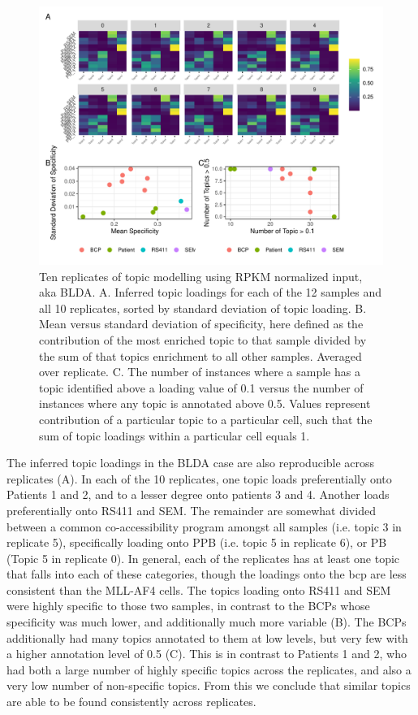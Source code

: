 \begin{figure}
    \centering
    \includegraphics[width=\textwidth]{plot/ch5/mll_redo_reps_bigwig.pdf}
    \caption{Ten replicates of topic modelling using RPKM normalized input, aka BLDA. A. Inferred topic loadings for each of the 12 samples and all 10 replicates, sorted by standard deviation of topic loading. B. Mean versus standard deviation of specificity, here defined as the contribution of the most enriched topic to that sample divided by the sum of that topics enrichment to all other samples. Averaged over replicate. C. The number of instances where a sample has a topic identified above a loading value of 0.1 versus the number of instances where any topic is annotated above 0.5. Values represent contribution of a particular topic to a particular cell, such that the sum of topic loadings within a particular cell equals 1.}
    \label{fig:mll_reps}
\end{figure}

The inferred topic loadings in the BLDA case are also reproducible across replicates (A). In each of the 10 replicates, one topic loads preferentially onto Patients 1 and 2, and to a lesser degree onto patients 3 and 4. Another loads preferentially onto RS411 and SEM. The remainder are somewhat divided between a common co-accessibility program amongst all samples (i.e. topic 3 in replicate 5), specifically loading onto PPB (i.e. topic 5 in replicate 6), or PB (Topic 5 in replicate 0). In general, each of the replicates has at least one topic that falls into each of these categories, though the loadings onto the \gls{bcp} are less consistent than the MLL-AF4 cells. The topics loading onto RS411 and SEM were highly specific to those two samples, in contrast to the BCPs whose specificity was much lower, and additionally much more variable (B).  The BCPs additionally had many topics annotated to them at low levels, but very few with a higher annotation level of 0.5 (C).  This is in contrast to Patients 1 and 2, who had both a large number of highly specific topics across the replicates, and also a very low number of non-specific topics.  From this we conclude that similar topics are able to be found consistently across replicates.  


